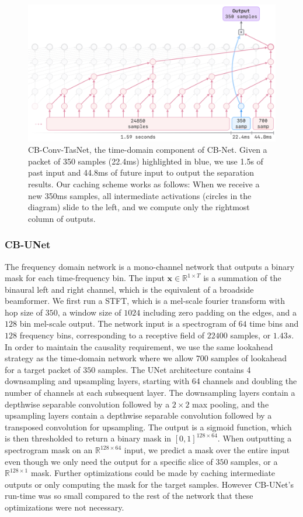 \documentclass [11pt, proquest] {uwthesis}[2020/02/24]
\begin{document}
\begin{figure}
\centering
\includegraphics[width=0.75\linewidth]{CB_figures/network-3.png}
\vskip -0.15in
\caption{ CB-Conv-TasNet, the time-domain component of CB-Net. Given a packet of 350 samples (22.4ms) highlighted in blue, we use 1.5s of past input and 44.8ms of future input to output the separation results. Our caching scheme works as follows: When we receive a new 350ms samples, all intermediate activations (circles in the diagram) slide to the left, and we compute only the rightmost column of outputs.}
\label{fig:network}
\vskip -0.3in
\end{figure}

\subsubsection{CB-UNet}

The frequency domain network is a mono-channel network that outputs a binary mask for each time-frequency bin. The input $\textbf{x} \in \mathbb{R}^{1 \times T}$ is a summation of the binaural left and right channel, which is the equivalent of a broadside beamformer. We first run a STFT, which is a mel-scale fourier transform with hop size of $350$, a window size of  $1024$ including zero padding on the edges, and a $128$ bin mel-scale output. The network input is a spectrogram of $64$ time bins and $128$ frequency bins, corresponding to a receptive field of $22400$ samples, or $1.43s$. In order to maintain the causality requirement, we use the same lookahead strategy as the time-domain network where we allow $700$ samples of lookahead for a target packet of $350$ samples. The UNet architecture contains 4 downsampling and upsampling layers, starting with 64 channels and doubling the number of channels at each subsequent layer. The downsampling layers contain a depthwise separable convolution followed by a $2 \times 2$ max pooling, and the upsampling layers contain a depthwise separable convolution followed by a transposed convolution for upsampling. The output is a sigmoid function, which is then thresholded to return a binary mask in $[0, 1]^{128 \times 64}$.  When outputting a spectrogram mask on an $\mathbb{R}^{128 \times 64}$ input, we predict a mask over the entire input even though we only need the output for a specific slice of $350$ samples, or a $\mathbb{R}^{128 \times 1}$ mask. Further optimizations could be made by caching intermediate outputs or only computing the mask for the target samples. However CB-UNet's run-time  was so small compared to the rest of the network that these optimizations were not  necessary.
\end{document}
